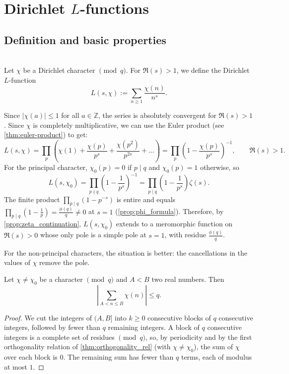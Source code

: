 \section{Dirichlet $L$-functions}
\subsection{Definition and basic properties}
\begin{definition}[$L$-function]\leavevmode\\
    Let $\chi$ be a Dirichlet character $\pmod q$. For $\Re(s)>1$, we define the Dirichlet $L$-function
    \begin{equation*}
        L(s,\chi):= \sum_{n\ge 1}\frac{\chi(n)}{n^s}.
    \end{equation*}
\end{definition}
Since $\lvert \chi(a)\rvert\le 1$ for all $a \in \mathbb{Z}$, the series is absolutely convergent for $\Re(s) > 1$. Since $\chi$ is completely multiplicative, we can use the Euler product (see \cref{thm:euler-product}) to get:
\begin{equation}\label{eq:L-function_euler_product}
    L(s,\chi)= \prod_{p}\left(\chi(1) + \frac{\chi(p)}{p^s} + \frac{\chi(p^2)}{p^{2s} }+ \dots\right) = \prod_{p}\left(1-\frac{\chi(p)}{p^s}\right)^{-1}, \qquad \Re(s)>1.
\end{equation}
For the principal character, $\chi_0(p) = 0$ if $p\mid q$ and $\chi_0(p) = 1$ otherwise, so
\begin{equation}\label{eq:principal_char_l_function_relation}
    L(s,\chi_0) =   \prod_{p \nmid q}\left(1-\frac{1}{p^s}\right)^{-1}  = \prod_{p \mid q} \left(1-\frac{1}{p^s}\right) \zeta(s).
\end{equation}
The finite product $\prod_{p\mid q}(1-p^{-s})$ is entire and equals $\prod_{p\mid q}(1-\frac1p) = \frac{\phi(q)}{q}\neq0$ at $s=1$ (\cref{prop:phi_formula}). Therefore, by \cref{prop:zeta_continuation}, $L(s,\chi_0)$ extends to a meromorphic function on $\Re(s)>0$ whose only pole is a simple pole at $s=1$, with residue $\frac{\phi(q)}{q}$.

For the non-principal characters, the situation is better: the cancellations in the values of $\chi$ remove the pole.
\begin{lemma}\label{lem:upper_bound_dir_char_sum}
    Let $\chi \neq \chi_0$ be a character $\pmod q$ and $A<B$ two real numbers. Then
    \begin{equation*}
        \left\lvert\sum_{A< n \le  B}\chi(n)\right\rvert \leq q.
    \end{equation*}
\end{lemma}
\begin{proof}
    We cut the integers of $(A,B]$ into $k\ge 0$ consecutive blocks of $q$ consecutive integers, followed by fewer than $q$ remaining integers. A block of $q$ consecutive integers is a complete set of residues $\pmod q$, so, by periodicity and by the first orthogonality relation of \cref{thm:orthogonality_rel} (with $\chi \neq \chi_0$), the sum of $\chi$ over each block is $0$. The remaining sum has fewer than $q$ terms, each of modulus at most $1$.
\end{proof}

